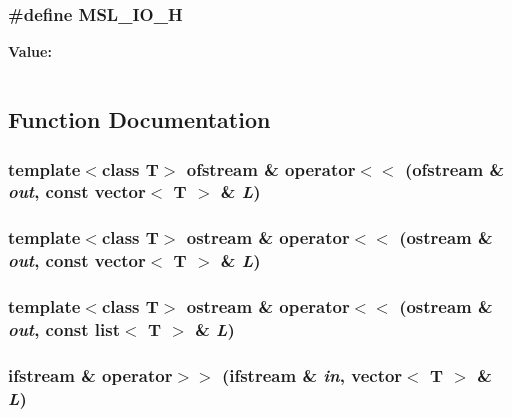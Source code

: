 \subsubsection{\setlength{\rightskip}{0pt plus 5cm}\#define MSL\_\-IO\_\-H}\label{mslio_8h_a0}


{\bf Value:}\footnotesize\begin{verbatim}
\end{verbatim}\normalsize 


\subsection{Function Documentation}
\subsubsection{\setlength{\rightskip}{0pt plus 5cm}template$<$class T$>$ ofstream \& operator$<$$<$ (ofstream \& {\em out}, const vector$<$ T $>$ \& {\em L})}\label{mslio_8h_a5}


\subsubsection{\setlength{\rightskip}{0pt plus 5cm}template$<$class T$>$ ostream \& operator$<$$<$ (ostream \& {\em out}, const vector$<$ T $>$ \& {\em L})}\label{mslio_8h_a3}


\subsubsection{\setlength{\rightskip}{0pt plus 5cm}template$<$class T$>$ ostream \& operator$<$$<$ (ostream \& {\em out}, const {\bf list}$<$ T $>$ \& {\em L})}\label{mslio_8h_a1}


\subsubsection{\setlength{\rightskip}{0pt plus 5cm}ifstream \& operator$>$$>$ (ifstream \& {\em in}, vector$<$ T $>$ \& {\em L})}\label{mslio_8h_a6}


